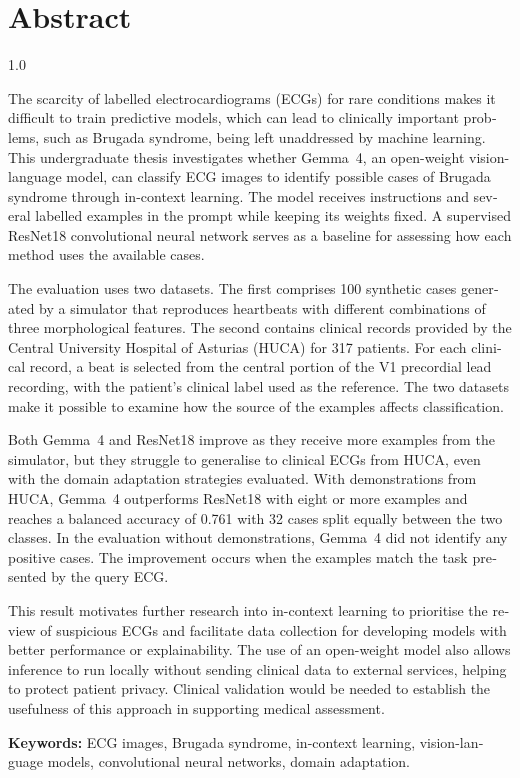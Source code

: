 \chapter*{Abstract}
\begin{spacing}{1.0}
\begin{otherlanguage}{english}

The scarcity of labelled electrocardiograms (ECGs) for rare conditions makes it difficult to train predictive models, which can lead to clinically important problems, such as Brugada syndrome, being left unaddressed by machine learning. This undergraduate thesis investigates whether Gemma~4, an open-weight vision-language model, can classify ECG images to identify possible cases of Brugada syndrome through in-context learning. The model receives instructions and several labelled examples in the prompt while keeping its weights fixed. A supervised ResNet18 convolutional neural network serves as a baseline for assessing how each method uses the available cases.

The evaluation uses two datasets. The first comprises 100 synthetic cases generated by a simulator that reproduces heartbeats with different combinations of three morphological features. The second contains clinical records provided by the Central University Hospital of Asturias (HUCA) for 317 patients. For each clinical record, a beat is selected from the central portion of the V1 precordial lead recording, with the patient’s clinical label used as the reference. The two datasets make it possible to examine how the source of the examples affects classification.

Both Gemma~4 and ResNet18 improve as they receive more examples from the simulator, but they struggle to generalise to clinical ECGs from HUCA, even with the domain adaptation strategies evaluated. With demonstrations from HUCA, Gemma~4 outperforms ResNet18 with eight or more examples and reaches a balanced accuracy of 0.761 with 32 cases split equally between the two classes. In the evaluation without demonstrations, Gemma~4 did not identify any positive cases. The improvement occurs when the examples match the task presented by the query ECG.

This result motivates further research into in-context learning to prioritise the review of suspicious ECGs and facilitate data collection for developing models with better performance or explainability. The use of an open-weight model also allows inference to run locally without sending clinical data to external services, helping to protect patient privacy. Clinical validation would be needed to establish the usefulness of this approach in supporting medical assessment.

\textbf{Keywords:} ECG images, Brugada syndrome, in-context learning, vision-language models, convolutional neural networks, domain adaptation.

\end{otherlanguage}
\end{spacing}
